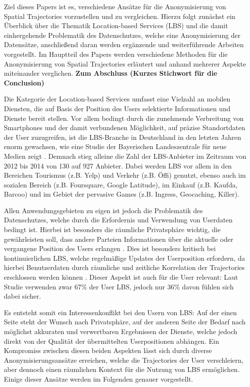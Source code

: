 Ziel dieses Papers ist es, verschiedene Ansätze für die Anonymisierung von Spatial Trajectories vorzustellen und zu vergleichen. Hierzu folgt zunächst ein Überblick über die Thematik Location-based Services (LBS) und die damit einhergehende Problematik des Datenschutzes, welche eine Anonymisierung der Datensätze, anschließend daran werden ergänzende und weiterführende Arbeiten vorgestellt. Im Hauptteil des Papers werden verschiedene Methoden für die Anonymisierung von Spatial Trajectories erläutert und anhand mehrerer Aspekte miteinander verglichen. \textbf{Zum Abschluss (Kurzes Stichwort für die Conclusion)}

Die Kategorie der Location-based Services umfasst eine Vielzahl an mobilen Diensten, die auf Basis der Position des Users selektierte Informationen und Dienste bereit stellen. Vor allem bedingt durch die zunehmende Verbreitung von Smartphones und der damit verbundenen Möglichkeit, auf präzise Standortdaten der User zuzugreifen, ist die LBS-Branche in Deutschland in den letzten Jahren enorm gewachsen, wie eine Studie der Bayerischen Landeszentrale für neue Medien zeigt \cite{Consulting2014}. Demnach stieg alleine die Zahl der LBS-Anbieter im Zeitraum von 2012 bis 2014 von 130 auf 927 Anbieter. Dabei werden LBS vor allem in den Bereichen Tourismus (z.B. Yelp) und Verkehr (z.B. Öffi) genutzt, ebenso auch im sozialen Bereich (z.B. Foursquare, Google Latitude), im Einkauf (z.B. Kaufda, Barcoo) und im Gebiet der pervasive Games (z.B. Ingress, Geocaching, Killer).

Allen Anwendungsgebieten zu eigen ist jedoch die Problematik des Datenschutzes, welche durch die Erfordernis und Verwendung von Userdaten bedingt ist. Hierbei ist besonders die räumliche Privatsphäre wichtig, die gewährleisten soll, dass andere Parteien Informationen über die aktuelle oder vergangene Position des Users erlangen \cite{Beresford2003}. Dies ist besonders kritisch bei kontinuierlichen LBS, welche regelmäßige Updates der Userposition erfordern, da hierbei Benutzerdaten durch räumliche und zeitliche Korrelation der Trajectories erschlossen werden können \cite{Chow2011}. Dieser Aspekt ist auch für die User relevant: Laut Studie verwenden zwar 67\% der User LBS, jedoch nur 36\% davon fühlen sich dabei sicher.

Es entsteht somit ein Interessenkonflikt bei den Usern von LBS: Auf der einen Seite steht der Wunsch nach Privatsphäre, auf der anderen Seite der Bedarf nach möglichst akkuraten und verwertbaren Ergebnissen der Dienste, welche jedoch direkt von der Qualität der übermittelten Userpositionen abhängen. Ein Kompromiss zwischen diesen beiden Aspekten lässt sich durch diverse Anonymisierungsansätze erreichen, welche die Trajectories der User verschleiern, aber dennoch einen räumlichen Kontext für die Nutzung von LBS ermöglichen. Einige dieser Ansätze werden im Folgenden genauer vorgestellt.